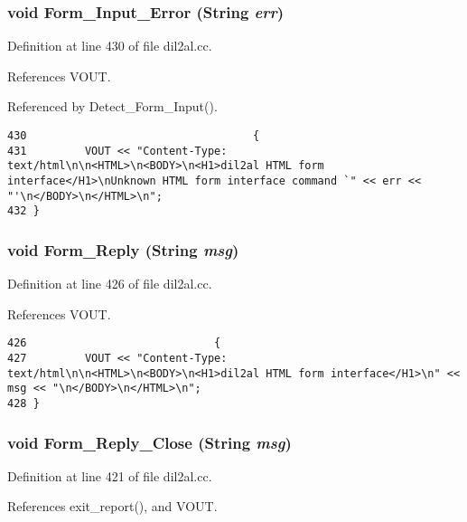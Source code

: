 \subsubsection{\setlength{\rightskip}{0pt plus 5cm}void Form\_\-Input\_\-Error ({\bf String} {\em err})}\label{dil2al_8cc_a109}




Definition at line 430 of file dil2al.cc.

References VOUT.

Referenced by Detect\_\-Form\_\-Input().



\footnotesize\begin{verbatim}430                                   {
431         VOUT << "Content-Type: text/html\n\n<HTML>\n<BODY>\n<H1>dil2al HTML form interface</H1>\nUnknown HTML form interface command `" << err << "'\n</BODY>\n</HTML>\n";
432 }
\end{verbatim}\normalsize 
{}
\subsubsection{\setlength{\rightskip}{0pt plus 5cm}void Form\_\-Reply ({\bf String} {\em msg})}\label{dil2al_8cc_a108}




Definition at line 426 of file dil2al.cc.

References VOUT.



\footnotesize\begin{verbatim}426                             {
427         VOUT << "Content-Type: text/html\n\n<HTML>\n<BODY>\n<H1>dil2al HTML form interface</H1>\n" << msg << "\n</BODY>\n</HTML>\n";
428 }
\end{verbatim}\normalsize 
{}
\subsubsection{\setlength{\rightskip}{0pt plus 5cm}void Form\_\-Reply\_\-Close ({\bf String} {\em msg})}\label{dil2al_8cc_a107}




Definition at line 421 of file dil2al.cc.

References exit\_\-report(), and VOUT.

